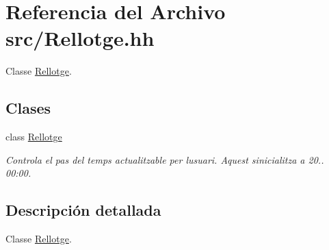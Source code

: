\hypertarget{_rellotge_8hh}{}\section{Referencia del Archivo src/\+Rellotge.hh}
\label{_rellotge_8hh}


Classe \hyperlink{class_rellotge}{Rellotge}.  


\subsection*{Clases}
\begin{DoxyCompactItemize}
\item 
class \hyperlink{class_rellotge}{Rellotge}
\begin{DoxyCompactList}\small\item\em Controla el pas del temps actualitzable per l\textquotesingle{}usuari. Aquest s\textquotesingle{}inicialitza a 20.. 00\+:00. \end{DoxyCompactList}\end{DoxyCompactItemize}


\subsection{Descripción detallada}
Classe \hyperlink{class_rellotge}{Rellotge}. 


